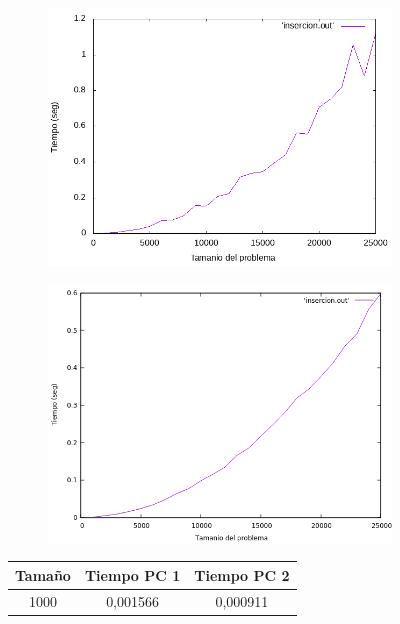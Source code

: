 \documentclass[12pt,spanish]{article}
\begin{document}
\begin{figure}[H]
\centering
\begin{subfigure}[b]{0.45\textwidth}
\includegraphics[scale=0.45]{empirica_insercion.png}
\caption{}
\end{subfigure}
\quad
\begin{subfigure}[b]{0.45\textwidth}
\includegraphics[scale=0.45]{empirica_insercion_2.png}
\caption{}
\end{subfigure}
\begin{tabular}{|c|c|c|}
\hline
\textbf{Tamaño} & \textbf{Tiempo PC 1} & \textbf{Tiempo PC 2} \\
\hline
1000  & 0,001566 & 0,000911 \\

\end{tabular}
\end{figure}
\end{document}
